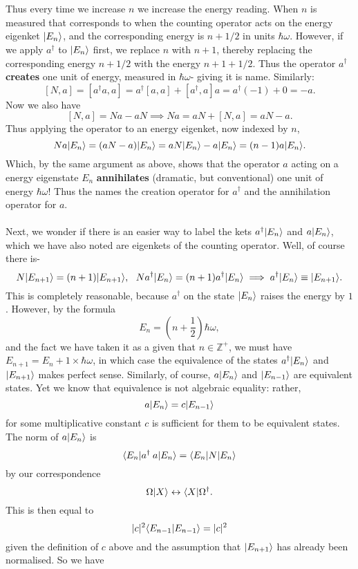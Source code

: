 \\\\
Thus every time we increase $n$ we increase the energy reading. When $n$ is measured that corresponds to when the counting operator acts on the energy eigenket $|E_{n}\rangle$, and the corresponding energy is $n+1/2$ in units $\hbar\omega$. However, if we apply $a^{\dagger}$ to $|E_{n}\rangle$ first, we replace $n$ with $n+1$, thereby replacing the corresponding energy $n+1/2$ with the energy $n+1+1/2$. Thus the operator $a^{\dagger}$ \textbf{creates} one unit of energy, measured in $\hbar\omega$- giving it is name. Similarly:
$$
[N,a]=[a^{\dagger}a,a]=a^{\dagger}[a,a]+[a^{\dagger},a]a=a^{\dagger}(-1)+0=-a.
$$
Now we also have
$$
[N,a]=Na-aN\implies Na=aN+[N,a]=aN-a.
$$
Thus applying the operator to an energy eigenket, now indexed by $n$,
$$
Na|E_{n}\rangle=(aN-a)|E_{n}\rangle=aN|E_{n}\rangle-a|E_{n}\rangle=(n-1)a|E_{n}\rangle.
$$
Which, by the same argument as above, shows that the operator $a$ acting on a energy eigenstate $E_{n}$ \textbf{annihilates} (dramatic, but conventional) one unit of energy $\hbar\omega$! Thus the names the creation operator for $a^{\dagger}$ and the annihilation operator for $a$.
\\\\
Next, we wonder if there is an easier way to label the kets $a^{\dagger}|E_{n}\rangle$ and $a|E_{n}\rangle$, which we have also noted are eigenkets of the counting operator. Well, of course there is-
$$
N|E_{n+1}\rangle=(n+1)|E_{n+1}\rangle, \:\:\: Na^{\dagger}|E_{n}\rangle=(n+1)a^{\dagger}|E_{n}\rangle\implies a^{\dagger}|E_{n}\rangle\equiv |E_{n+1}\rangle.
$$
This is completely reasonable, because $a^{\dagger}$ on the state $|E_{n}\rangle$ raises the energy by $1$. However, by the formula
$$
E_{n}=\left(n+\frac{1}{2}\right)\hbar\omega,
$$
and the fact we have taken it as a given that $n\in\mathbb{Z}^{+}$, we must have $E_{n+1}=E_{n}+1\times\hbar\omega$, in which case the equivalence of the states $a^{\dagger}|E_{n}\rangle$ and $|E_{n+1}\rangle$ makes perfect sense. Similarly, of course, $a|E_{n}\rangle$ and $|E_{n-1}\rangle$ are equivalent states. Yet we know that equivalence is not algebraic equality: rather,
$$
a|E_{n}\rangle=c|E_{n-1}\rangle
$$
for some multiplicative constant $c$ is sufficient for them to be equivalent states. The norm of $a|E_{n}\rangle$ is 
$$
\langle E_{n}|{a^{\dagger}\:a}|E_{n}\rangle=\langle E_{n}|{N}|E_{n}\rangle
$$
by our correspondence 
$$
\Omega|X\rangle\leftrightarrow\langle X|\Omega^{\dagger}.
$$
This is then equal to 
$$
|c|^2\langle E_{n-1}|E_{n-1}\rangle=|c|^2
$$
given the definition of $c$ above and the assumption that $|E_{n+1}\rangle$ has already been normalised. So we have 
